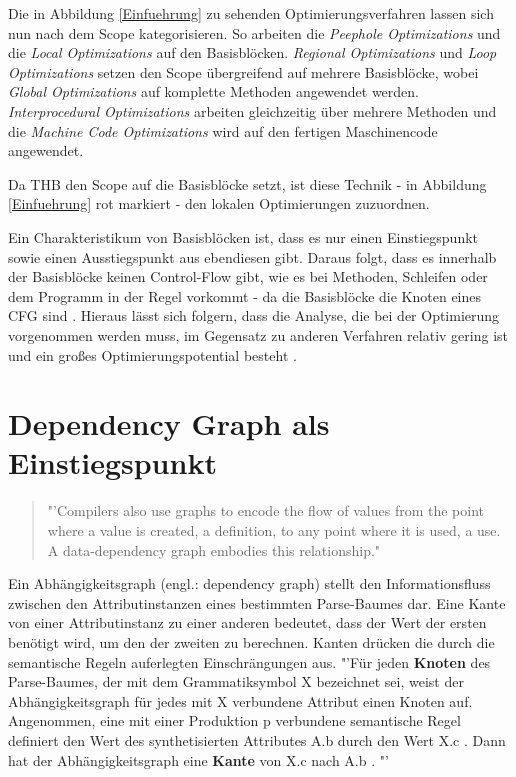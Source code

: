 Die in Abbildung \ref{Einfuehrung} zu sehenden Optimierungsverfahren lassen sich nun nach dem Scope kategorisieren. So arbeiten die \textit{Peephole Optimizations} und die \textit{Local Optimizations} auf den Basisblöcken. \textit{Regional Optimizations} und \textit{Loop Optimizations} setzen den Scope übergreifend auf mehrere Basisblöcke, wobei \textit{Global Optimizations} auf komplette Methoden angewendet werden. \textit{Interprocedural Optimizations} arbeiten gleichzeitig über mehrere Methoden und die \textit{Machine Code Optimizations} wird auf den fertigen Maschinencode angewendet.

Da \ac{THB} den Scope auf die Basisblöcke setzt, ist diese Technik - in Abbildung \ref{Einfuehrung} rot markiert - den lokalen Optimierungen zuzuordnen.

Ein Charakteristikum von Basisblöcken ist, dass es nur einen Einstiegspunkt sowie einen Ausstiegspunkt aus ebendiesen gibt. Daraus folgt, dass es innerhalb der Basisblöcke keinen Control-Flow gibt, wie es bei Methoden, Schleifen oder dem Programm in der Regel vorkommt - da die Basisblöcke die Knoten eines \ac{CFG} sind \cite{Allen:1970:CFA:390013.808479}. Hieraus lässt sich folgern, dass die Analyse, die bei der Optimierung vorgenommen werden muss, im Gegensatz zu anderen Verfahren relativ gering ist und ein großes Optimierungspotential besteht \cite{HeBIS-309344573}.

\newpage
\section{Dependency Graph als Einstiegspunkt}
\begin{quotation}
"'Compilers also use graphs to encode the flow of values from the point where a value is created, a definition, to any point where it is used, a use. A data-dependency graph embodies this relationship." \cite{HeBIS-309344573}
\end{quotation}
Ein Abhängigkeitsgraph (engl.: dependency graph) stellt den Informationsfluss zwischen den Attributinstanzen eines bestimmten Parse-Baumes dar. Eine Kante von einer Attributinstanz zu einer anderen bedeutet, dass der Wert der ersten benötigt wird, um den der zweiten zu berechnen. Kanten drücken die durch die semantische Regeln auferlegten Einschrängungen aus. "'Für jeden \textbf{Knoten} des Parse-Baumes, der mit dem Grammatiksymbol X bezeichnet sei, weist der Abhängigkeitsgraph für jedes mit X verbundene Attribut einen Knoten auf. Angenommen, eine mit einer Produktion p verbundene semantische Regel definiert den Wert des synthetisierten Attributes A.b durch den Wert X.c . Dann hat der Abhängigkeitsgraph eine \textbf{Kante} von X.c nach A.b . \cite{HeBIS-194410269}"' 

